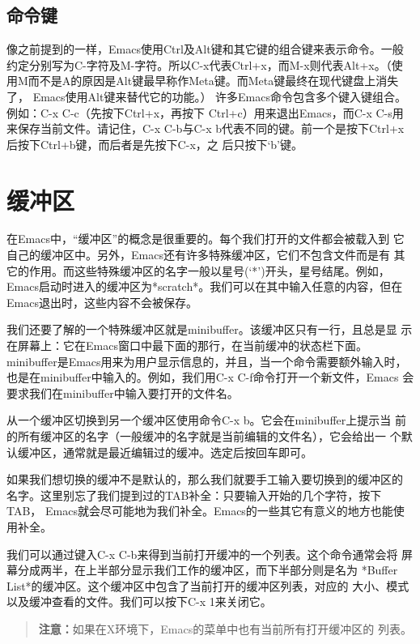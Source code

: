 \subsection{命令键}
\label{sec:emacs:start:commandKeys}
像之前提到的一样，Emacs使用Ctrl及Alt键和其它键的组合键来表示命令。一般
约定分别写为C-字符及M-字符。所以C-x代表Ctrl+x，而M-x则代表Alt+x。（使
用M而不是A的原因是Alt键最早称作Meta键。而Meta键最终在现代键盘上消失了，
Emacs使用Alt键来替代它的功能。）
许多Emacs命令包含多个键入键组合。例如：C-x C-c（先按下Ctrl+x，再按下
Ctrl+c）用来退出Emacs，而C-x C-s用来保存当前文件。请记住，C-x C-b与C-x
b代表不同的键。前一个是按下Ctrl+x后按下Ctrl+b键，而后者是先按下C-x，之
后只按下`b'键。

\section{缓冲区}
\label{sec:emacs:buffers}
在Emacs中，``缓冲区''的概念是很重要的。每个我们打开的文件都会被载入到
它自己的缓冲区中。另外，Emacs还有许多特殊缓冲区，它们不包含文件而是有
其它的作用。而这些特殊缓冲区的名字一般以星号(`*')开头，星号结尾。例如，
Emacs启动时进入的缓冲区为*scratch*。我们可以在其中输入任意的内容，但在
Emacs退出时，这些内容不会被保存。

我们还要了解的一个特殊缓冲区就是minibuffer。该缓冲区只有一行，且总是显
示在屏幕上：它在Emacs窗口中最下面的那行，在当前缓冲的状态栏下面。
minibuffer是Emacs用来为用户显示信息的，并且，当一个命令需要额外输入时，
也是在minibuffer中输入的。例如，我们用C-x C-f命令打开一个新文件，Emacs
会要求我们在minibuffer中输入要打开的文件名。

从一个缓冲区切换到另一个缓冲区使用命令C-x b。它会在minibuffer上提示当
前的所有缓冲区的名字（一般缓冲的名字就是当前编辑的文件名），它会给出一
个默认缓冲区，通常就是最近编辑过的缓冲。选定后按回车即可。

如果我们想切换的缓冲不是默认的，那么我们就要手工输入要切换到的缓冲区的
名字。这里别忘了我们提到过的TAB补全：只要输入开始的几个字符，按下TAB，
Emacs就会尽可能地为我们补全。Emacs的一些其它有意义的地方也能使用补全。

我们可以通过键入C-x C-b来得到当前打开缓冲的一个列表。这个命令通常会将
屏幕分成两半，在上半部分显示我们工作的缓冲区，而下半部分则是名为
*Buffer List*的缓冲区。这个缓冲区中包含了当前打开的缓冲区列表，对应的
大小、模式以及缓冲查看的文件。我们可以按下C-x 1来关闭它。

\begin{quote}
  \textbf{注意：}如果在X环境下，Emacs的菜单中也有当前所有打开缓冲区的
  列表。
\end{quote}

